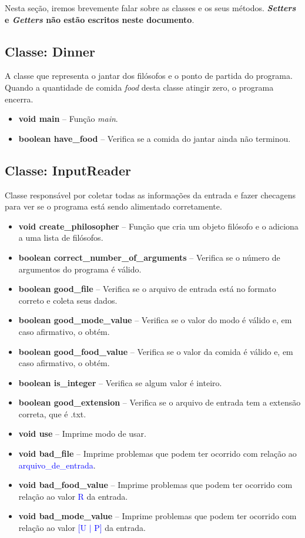\documentclass[11pt]{article}
\begin{document}
Nesta seção, iremos brevemente falar sobre as classes e os seus métodos. \textbf{\textit{Setters} e \textit{Getters} não estão escritos neste documento}.

\subsection{Classe: Dinner}
A classe que representa o jantar dos filósofos e o ponto de partida do programa. Quando a quantidade de comida \textit{food} desta classe atingir zero, o programa encerra. 
\begin{itemize}
	\item \textbf{\textcolor{sblue}{void} main} -- Função \textit{main}.
	\item \textbf{\textcolor{sblue}{boolean} have\_food} -- Verifica se a comida do jantar ainda não terminou.
\end{itemize}

\subsection{Classe: InputReader}
Classe responsável por coletar todas as informações da entrada e fazer checagens para ver se o programa está sendo alimentado corretamente. 
\begin{itemize}
	\item \textbf{\textcolor{sblue}{void} create\_philosopher} -- Função que cria um objeto filósofo e o adiciona a uma lista de filósofos.
	\item \textbf{\textcolor{sblue}{boolean} correct\_number\_of\_arguments} -- Verifica se o número de argumentos do programa é válido.
	\item \textbf{\textcolor{sblue}{boolean} good\_file} -- Verifica se o arquivo de entrada está no formato correto e coleta seus dados.
	\item \textbf{\textcolor{sblue}{boolean} good\_mode\_value} -- Verifica se o valor do modo é válido e, em caso afirmativo, o obtém.
	\item \textbf{\textcolor{sblue}{boolean} good\_food\_value} -- Verifica se o valor da comida é válido e, em caso afirmativo, o obtém.
	\item \textbf{\textcolor{sblue}{boolean} is\_integer} -- Verifica se algum valor é inteiro.
	\item \textbf{\textcolor{sblue}{boolean} good\_extension} -- Verifica se o arquivo de entrada tem a extensão correta, que é .txt.
	\item \textbf{\textcolor{sblue}{void} use} -- Imprime modo de usar.
	\item \textbf{\textcolor{sblue}{void} bad\_file} -- Imprime problemas que podem ter ocorrido com relação ao \textcolor{blue}{arquivo\_de\_entrada}.
	\item \textbf{\textcolor{sblue}{void} bad\_food\_value} -- Imprime problemas que podem ter ocorrido com relação ao valor \textcolor{blue}{R} da entrada.
	\item \textbf{\textcolor{sblue}{void} bad\_mode\_value} -- Imprime problemas que podem ter ocorrido com relação ao valor \textcolor{blue}{[U $|$ P]} da entrada.
\end{itemize}
\end{document}
